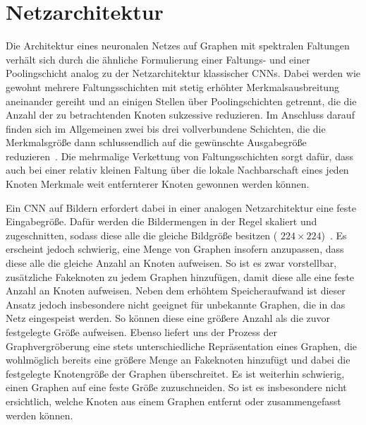 \section{Netzarchitektur}
\label{spektrale_netzarchitektur}

Die Architektur eines neuronalen Netzes auf Graphen mit spektralen Faltungen verhält sich durch die ähnliche Formulierung einer Faltungs- und einer Poo\-ling\-sch\-icht analog zu der Netzarchitektur klassischer \glspl{CNN}.
Dabei werden wie gewohnt mehrere Faltungsschichten mit stetig erhöhter Merkmalsausbreitung aneinander gereiht und an einigen Stellen über Poolingschichten getrennt, die die Anzahl der zu betrachtenden Knoten sukzessive reduzieren.
Im Anschluss darauf finden sich im Allgemeinen zwei bis drei vollverbundene Schichten, die die Merkmalsgröße dann schlussendlich auf die gewünschte Ausgabegröße reduzieren~\cite{Nielsen}.
Die mehrmalige Verkettung von Faltungsschichten sorgt dafür, dass auch bei einer relativ kleinen Faltung über die lokale Nachbarschaft eines jeden Knoten Merkmale weit entfernterer Knoten gewonnen werden können.

Ein \gls{CNN} auf Bildern erfordert dabei in einer analogen Netzarchitektur eine feste Eingabegröße.
Dafür werden die Bildermengen in der Regel skaliert und zugeschnitten, sodass diese alle die gleiche Bildgröße besitzen (\zB{} $224 \times 224$)~\cite{spp}.
Es erscheint jedoch schwierig, eine Menge von Graphen insofern anzupassen, dass diese alle die gleiche Anzahl an Knoten aufweisen.
So ist es zwar vorstellbar, zusätzliche Fakeknoten zu jedem Graphen hinzufügen, damit diese alle eine feste Anzahl an Knoten aufweisen.
Neben dem erhöhtem Speicheraufwand ist dieser Ansatz jedoch insbesondere nicht geeignet für unbekannte Graphen, die in das Netz eingespeist werden.
So können diese \evtl{} eine größere Anzahl als die zuvor festgelegte Größe aufweisen.
Ebenso liefert uns der Prozess der Graphvergröberung eine stets unterschiedliche Repräsentation eines Graphen, die wohlmöglich bereits eine größere Menge an Fakeknoten hinzufügt und dabei die festgelegte Knotengröße der Graphen überschreitet.
Es ist weiterhin schwierig, einen Graphen auf eine feste Größe zuzuschneiden.
So ist es insbesondere nicht ersichtlich, welche Knoten aus einem Graphen entfernt oder zusammengefasst werden können.

